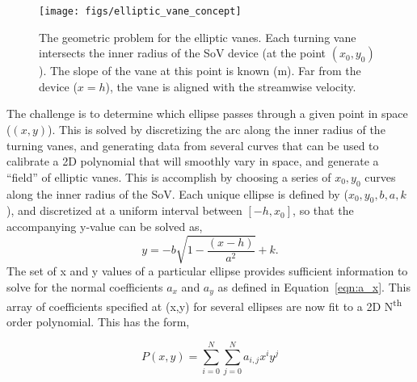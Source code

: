 
 \begin{figure}[!htb]
  \begin{center}
   \texttt{[image: figs/elliptic\_vane\_concept]}
   \caption{The geometric problem for the elliptic vanes. Each turning vane intersects
   the inner radius of the SoV device (at the point $(x_0,y_0)$). 
   The slope of the vane at this point is known (m). 
   Far from the device ($x=h$), the vane is aligned with the streamwise velocity. }
   \label{fig:elliptic_vane_concept}
  \end{center}
 \end{figure}

The challenge is to determine which ellipse passes through 
a given point in space ($(x,y)$). 
This is solved by discretizing the arc along the inner radius 
of the turning vanes, and generating data from
several curves that can be used to calibrate a 2D polynomial that will
smoothly vary in space, and generate a ``field'' of elliptic vanes. 
This is accomplish by choosing a series of
$x_0,y_0$ curves along the inner radius of the SoV. 
Each unique ellipse is defined by ($x_0,y_0,b,a,k$),
and discretized at a uniform interval between $\left[-h,x_0\right]$, 
so that the accompanying y-value can be solved as, 
\begin{equation}
 y = -b \sqrt{1-\frac{(x-h)}{a^2}} + k. 
\end{equation}
The set of x and y values of a particular ellipse 
provides sufficient information to solve for the normal coefficients
$a_x$ and $a_y$ as defined in Equation~\ref{eqn:a_x}. This array of
coefficients specified at (x,y) for several ellipses 
are now fit to a 2D N\textsuperscript{th}
order polynomial. This has the form, 

\begin{equation}
 P(x,y) = \sum_{i=0}^N  \sum_{j=0}^N a_{i,j} x^i y^j
\end{equation}

